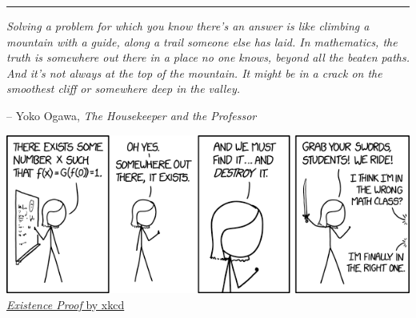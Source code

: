 

%
\vspace*{5em}
%
\centering
\hrule
\vspace*{5em}
\begin{center}
\emph{Solving a problem for which you know there's an answer is like climbing a mountain with a guide, along a trail someone else has laid. In mathematics, the truth is somewhere out there in a place no one knows, beyond all the beaten paths. And it's not always at the top of the mountain. It might be in a crack on the smoothest cliff or somewhere deep in the valley.}
\end{center}
\vspace*{-1em}
\hfill {\small -- Yoko Ogawa, \textsl{The Housekeeper and the Professor}}
\vfill
\begin{center}
\includegraphics[scale=0.6]{existence_proof.png}\\[0.5em]
\href{https://xkcd.com/1856/}{\emph{Existence Proof} by xkcd}
\end{center}
\vfill
\vfill

